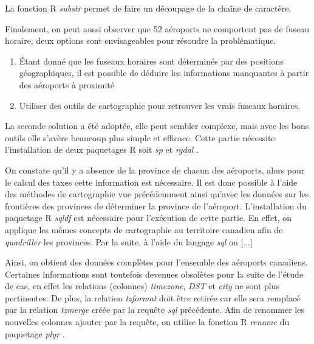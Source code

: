\documentclass{report}
\begin{document}
%
%
La fonction R \textit{substr} \cite{Rfunction:substr} permet de faire un découpage de la chaîne de caractère.

Finalement, on peut aussi observer que 52 aéroports ne comportent pas de fuseau horaire, deux options sont envisageables pour résoudre la problématique.

\begin{enumerate}
\item Étant donné que les fuseaux horaires sont déterminés par des positions géographiques, il est possible de déduire les informations manquantes à partir des aéroports à proximité
\item Utiliser des outils de cartographie pour retrouver les vrais fuseaux horaires.
\end{enumerate}

La seconde solution a été adoptée, elle peut sembler complexe, mais avec les bons outils elle s'avère beaucoup plus simple et efficace. Cette partie nécessite l'installation de deux paquetages R soit \textit{sp} \cite{Rpackage:sp} et \textit{rgdal} \cite{Rpackage:rgdal}.


%
%


%
%
On constate qu'il y a absence de la province de chacun des aéroports, alors pour le calcul des taxes cette information est nécessaire. Il est donc possible à l'aide des méthodes de cartographie vue précédemment ainsi qu'avec les données sur les frontières des provinces \cite{Data:BoundaryFiles} de déterminer la province de l'aéroport. L'installation du paquetage R \textit{sqldf} \cite{Rpackage:sqldf} est nécessaire pour l'exécution de cette partie. En effet, on applique les mêmes concepts de cartographie au territoire canadien afin de \emph{quadriller} les provinces. Par la suite, à l'aide du langage \emph{sql} \cite{Language:sql} on [...] %

Ainsi, on obtient des données complètes pour l'ensemble des aéroports canadiens. Certaines informations sont toutefois devenues obsolètes pour la suite de l'étude de cas, en effet les relations (colonnes) \textit{ timezone}, \textit{DST} et \textit{city} ne sont plus pertinentes. De plus, la relation \textit{ tzformat} doit être retirée car elle sera remplacé par la relation \textit{tzmerge} créée par la requête \textit{sql} précédente. Afin de renommer les nouvelles colonnes ajouter par la requête, on utilise la fonction R \textit{rename} \cite{Rfunction:rename,} du paquetage \textit{plyr} \cite{Rpackage:plyr}.
\end{document}
